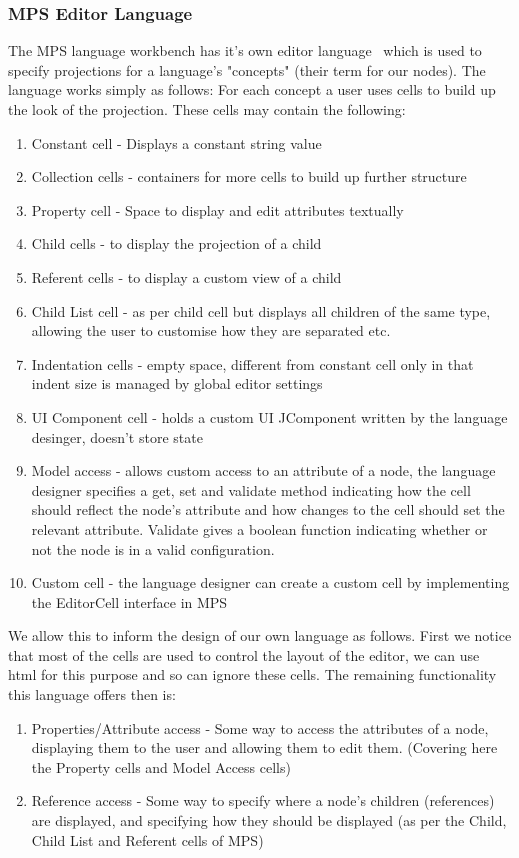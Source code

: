 \documentclass{article}
\begin{document}
\subsubsection{MPS Editor Language}
The MPS language workbench has it's own editor language~\cite{mpsEditorLanguage} which is used to specify projections for a language's "concepts" (their term for our nodes). The language works simply as follows: For each concept a user uses cells to build up the look of the projection. These cells may contain the following:
\begin{enumerate}
\item Constant cell - Displays a constant string value
\item Collection cells - containers for more cells to build up further structure
\item Property cell - Space to display and edit attributes textually
\item Child cells - to display the projection of a child
\item Referent cells - to display a custom view of a child
\item Child List cell - as per child cell but displays all children of the same type, allowing the user to customise how they are separated etc.
\item Indentation cells - empty space, different from constant cell only in that indent size is managed by global editor settings
\item UI Component cell - holds a custom UI JComponent written by the language desinger, doesn't store state
\item Model access - allows custom access to an attribute of a node, the language designer specifies a get, set and validate method indicating how the cell should reflect the node's attribute and how changes to the cell should set the relevant attribute. Validate gives a boolean function indicating whether or not the node is in a valid configuration.
\item Custom cell - the language designer can create a custom cell by implementing the EditorCell interface in MPS
\end{enumerate}
%
We allow this to inform the design of our own language as follows. First we notice that most of the cells are used to control the layout of the editor, we can use html for this purpose and so can ignore these cells. The remaining functionality this language offers then is:
\begin{enumerate}
\item Properties/Attribute access - Some way to access the attributes of a node, displaying them to the user and allowing them to edit them.  (Covering here the Property cells and Model Access cells)
\item Reference access - Some way to specify where a node's children (references) are displayed, and specifying how they should be displayed (as per the Child, Child List and Referent cells of MPS)
\end{enumerate}
\end{document}
